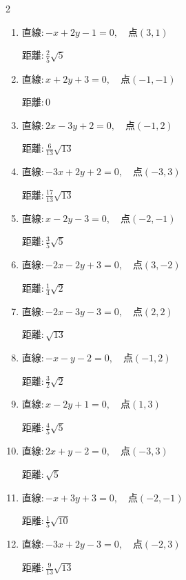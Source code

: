 \begin{multicols}{2}
\begin{enumerate}
  \item $直線:-x+2y-1=0,\quad 点 ( 3, 1 )$

        $\displaystyle 距離 : \frac{2}{5}\sqrt{5}$

  \item $直線:x+2y+3=0,\quad 点 ( -1, -1 )$

        $\displaystyle 距離 : 0$

  \item $直線:2x-3y+2=0,\quad 点 ( -1, 2 )$

        $\displaystyle 距離 : \frac{6}{13}\sqrt{13}$

  \item $直線:-3x+2y+2=0,\quad 点 ( -3, 3 )$

        $\displaystyle 距離 : \frac{17}{13}\sqrt{13}$

\columnbreak %

  \item $直線:x-2y-3=0,\quad 点 ( -2, -1 )$

        $\displaystyle 距離 : \frac{3}{5}\sqrt{5}$

  \item $直線:-2x-2y+3=0,\quad 点 ( 3, -2 )$

        $\displaystyle 距離 : \frac{1}{4}\sqrt{2}$

  \item $直線:-2x-3y-3=0,\quad 点 ( 2, 2 )$

        $\displaystyle 距離 : \sqrt{13}$

  \item $直線:-x-y-2=0,\quad 点 ( -1, 2 )$

        $\displaystyle 距離 : \frac{3}{2}\sqrt{2}$

  \item $直線:x-2y+1=0,\quad 点 ( 1, 3 )$

        $\displaystyle 距離 : \frac{4}{5}\sqrt{5}$

  \item $直線:2x+y-2=0,\quad 点 ( -3, 3 )$

        $\displaystyle 距離 : \sqrt{5}$

  \item $直線:-x+3y+3=0,\quad 点 ( -2, -1 )$

        $\displaystyle 距離 : \frac{1}{5}\sqrt{10}$

  \item $直線:-3x+2y-3=0,\quad 点 ( -2, 3 )$

        $\displaystyle 距離 : \frac{9}{13}\sqrt{13}$


\end{enumerate}
\end{multicols}
